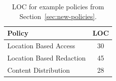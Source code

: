 




\begin{table}[h!]
\centering
{\small
\begin{tabular}{|l|c|}
\hline
\textbf{Policy}          & \textbf{LOC} \\ \hline\hline
Location Based Access & 30  \\ \hline
Location Based Redaction    & 45  \\ \hline
Content Distribution     & 28  \\ \hline
\end{tabular}
}
\caption{LOC for example policies from Section~\ref{sec:new-policies}.}
\label{policy-loc}
\end{table}

